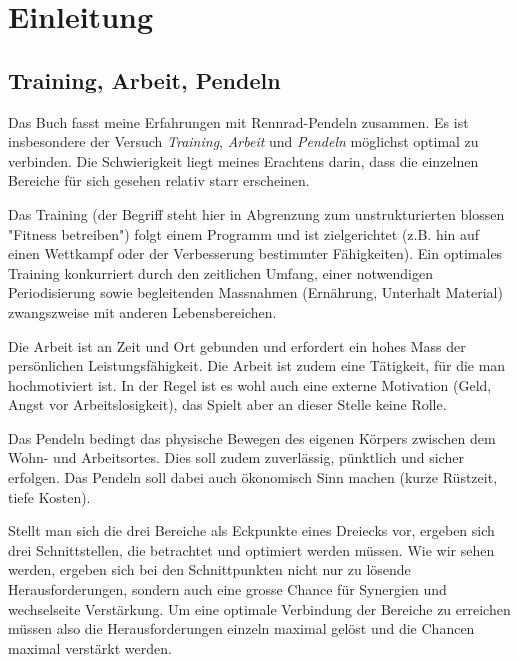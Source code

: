 \chapter{Einleitung}


\section{Training, Arbeit, Pendeln}

Das Buch fasst meine Erfahrungen mit Rennrad-Pendeln zusammen.
Es ist insbesondere der Versuch \emph{Training}, \emph{Arbeit} und \emph{Pendeln} möglichst optimal zu verbinden.
Die Schwierigkeit liegt meines Erachtens darin, dass die einzelnen Bereiche für sich gesehen relativ starr erscheinen.

Das Training (der Begriff steht hier in Abgrenzung zum unstrukturierten blossen "Fitness betreiben") folgt einem Programm
und ist zielgerichtet (z.B. hin auf einen Wettkampf oder der Verbesserung bestimmter Fähigkeiten).
Ein optimales Training konkurriert durch den zeitlichen Umfang, einer notwendigen Periodisierung sowie
begleitenden Massnahmen (Ernährung, Unterhalt Material) zwangszweise mit anderen Lebensbereichen.

Die Arbeit ist an Zeit und Ort gebunden und erfordert ein hohes Mass der persönlichen Leistungsfähigkeit.
Die Arbeit ist zudem eine Tätigkeit, für die man hochmotiviert ist.
In der Regel ist es wohl auch eine externe Motivation (Geld, Angst vor Arbeitslosigkeit),
das Spielt aber an dieser Stelle keine Rolle.

Das Pendeln bedingt das physische Bewegen des eigenen Körpers zwischen dem Wohn- und Arbeitsortes.
Dies soll zudem zuverlässig, pünktlich und sicher erfolgen.
Das Pendeln soll dabei auch ökonomisch Sinn machen (kurze Rüstzeit, tiefe Kosten).

Stellt man sich die drei Bereiche als Eckpunkte eines Dreiecks vor, ergeben sich drei Schnittstellen,
die betrachtet und optimiert werden müssen.
Wie wir sehen werden, ergeben sich bei den Schnittpunkten nicht nur zu lösende Herausforderungen,
sondern auch eine grosse Chance für Synergien und wechselseite Verstärkung.
Um eine optimale Verbindung der Bereiche zu erreichen müssen also die Herausforderungen einzeln maximal gelöst
und die Chancen maximal verstärkt werden.

